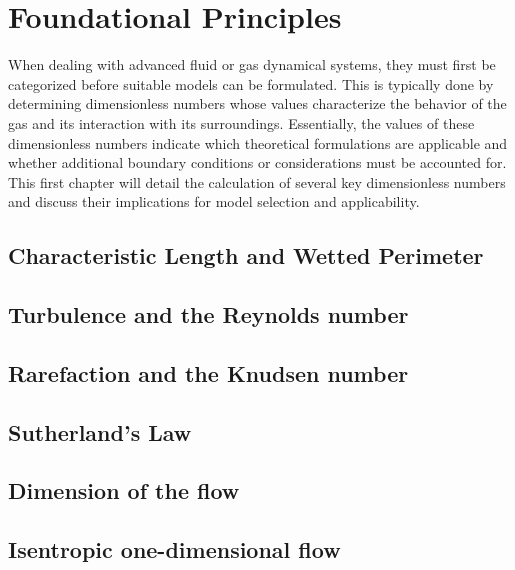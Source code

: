 \section{Foundational Principles}
	When dealing with advanced fluid or gas dynamical systems, they must first be categorized before suitable models can be formulated.
	This is typically done by determining dimensionless numbers whose values characterize the behavior of the gas and its interaction with its surroundings.
	Essentially, the values of these dimensionless numbers indicate which theoretical formulations are applicable and whether additional boundary conditions or considerations must be accounted for.
	This first chapter will detail the calculation of several key dimensionless numbers and discuss their implications for model selection and applicability.

\subsection{Characteristic Length and Wetted Perimeter}\label{sec:characteristic-length}


\subsection{Turbulence and the Reynolds number}


\subsection{Rarefaction and the Knudsen number}


\subsection{Sutherland's Law}


\subsection{Dimension of the flow}\label{sec:flow-dimension-foundations}


\subsection{Isentropic one-dimensional flow}\label{sec:isentropic-1D-foundations}

